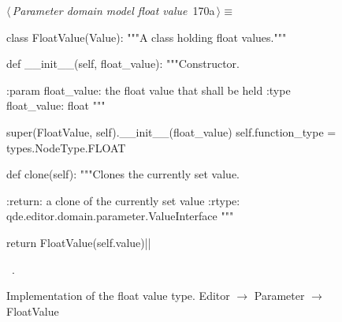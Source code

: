 \documentclass[%
    a4paper,    %
    justified,  %
    nobib,      %
    openany     %
]{tufte-book}
\makeatletter
\renewcommand{\label}[1]{\@tufte@label{##1}}%
\makeatother
\begin{document}
\begin{figure}[!htbp]
\begin{flushleft} \small
\begin{minipage}{\linewidth}\label{scrap138}\raggedright\small
{} $\langle\,${\itshape Parameter domain model float value}\nobreak\ {\footnotesize {170a}}$\,\rangle\equiv$
\vspace{-1ex}
\begin{pythoncode}
class FloatValue(Value):
    """A class holding float values."""

    def __init__(self, float_value):
        """Constructor.

        :param float_value: the float value that shall be held
        :type  float_value: float
        """

        super(FloatValue, self).__init__(float_value)
        self.function_type = types.NodeType.FLOAT

    def clone(self):
        """Clones the currently set value.

        :return: a clone of the currently set value
        :rtype:  qde.editor.domain.parameter.ValueInterface
        """

        return FloatValue(self.value)|\NWsep|
\end{pythoncode}
\vspace{1.5ex}
\footnotesize
\begin{list}{}{\setlength{\itemsep}{-\parsep}\setlength{\itemindent}{-\leftmargin}}
\item \NWtxtMacroRefIn\ .

\item{}
\end{list}
\end{minipage}\vspace{4ex}
\end{flushleft}
\caption{Implementation of the float value type.
  \newline{}\newline{}Editor $\rightarrow$ Parameter $\rightarrow$
  FloatValue}
\end{figure}
\end{document}
